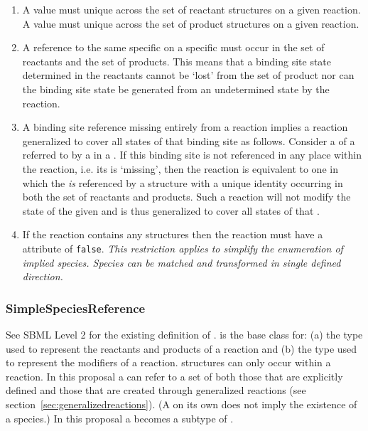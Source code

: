 \documentclass{cekarticle}
\begin{document}
\begin{enumerate}

\item A   value must unique
across the set of reactant  structures on
a given reaction. A   value
must unique across the set of product 
structures on a given reaction.

\item A reference to the same specific  on a
specific  must occur in the set of
reactants and the set of products.  This means that a binding site
state determined in the reactants cannot be `lost' from the set of
product nor can the binding site state be generated from an
undetermined state by the reaction.

\item A binding site reference missing entirely from a reaction
implies a reaction generalized to cover all states of that binding
site as follows. Consider a  of a
 referred to by a 
in a .  If this binding site is not referenced in
any place within the reaction, i.e. its is `missing', then the
reaction is equivalent to one in which the 
\emph{is} referenced by a  structure with a
unique identity occurring in both the set of reactants and
products.  Such a reaction will not modify the state of the given
 and is thus generalized to cover all states of
that .

\item If the reaction contains any  structures
then the reaction must have a  attribute of
\texttt{false}. \emph{This restriction applies to simplify the
enumeration of implied species.  Species can be matched and
transformed in single defined direction.}

\end{enumerate}

\subsubsection{SimpleSpeciesReference}

See SBML Level 2 for the existing definition of
.  is
the base class for: (a)  the type used to
represent the reactants and products of a reaction and (b)
 the type used to represent the
modifiers of a reaction.  
structures can only occur within a reaction. In this proposal a
 can refer to a set of
 both those that are explicitly defined and those
that are created through generalized reactions (see
section~\ref{sec:generalizedreactions}).  (A
 on its own does not imply the
existence of a species.) In this proposal a
 becomes a subtype of
.
\end{document}
